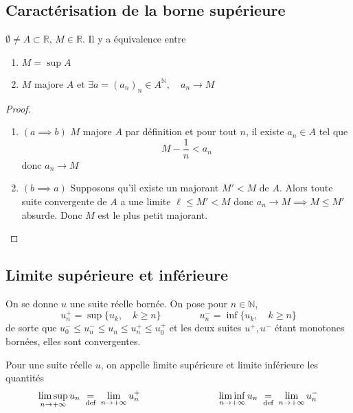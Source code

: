 \subsection{Caractérisation de la borne supérieure}

\begin{thm}
    \Hyp $\emptyset\neq A\subset\mathbb R$, $M\in\mathbb R$.
    \Conc Il y a équivalence entre \begin{enumerate}[label=(\alph{enumi}),left=1.2cm]
        \item $M=\sup A$
        \item $M$ majore $A$ et $\exists a=(a_n)_n\in A^{\mathbb N}, \quad a_n \longrightarrow M$
    \end{enumerate}
\end{thm}

\begin{proof}
    ~ \begin{enumerate}
        \item $(a\implies b)$ $M$ majore $A$ par définition et pour tout $n$, il existe $a_n\in A$ tel que \[
                M-\frac1n<a_n
            \]
            donc $a_n\longrightarrow M$
        \item $(b\implies a)$ Supposons qu'il existe un majorant $M'<M$ de $A$. Alors toute suite convergente de $A$ a une limite $\ell\leq M'<M$ donc $a_n\longrightarrow M\implies M\leq M'$ absurde. Donc $M$ est le plus petit majorant.
    \end{enumerate}
\end{proof}

\subsection{Limite supérieure et inférieure}

On se donne $u$ une suite réelle bornée. On pose pour $n\in\mathbb N$, \[
    u_n^+=\sup\{u_k, \quad k\geq n\}\qquad \qquad u_n^-=\inf \{u_k,\quad k\geq n\}
\]
de sorte que $u_0^-\leq u_n^-\leq u_n\leq u_n^+\leq u_0^+$ et les deux suites $u^+, u^-$ étant monotones bornées, elles sont convergentes.

\begin{dfn}
    Pour une suite réelle $u$, on appelle limite supérieure et limite inférieure les quantités \[
        \limsup_{n\to+\infty}u_n\;\underset{\text{def}}=\;\lim_{n\to+\infty}u_n^+\qquad\qquad\qquad\qquad \liminf_{n\to+\infty}u_n\;\underset{\text{def}}=\;\lim_{n\to+\infty}u_n^-
    \]
\end{dfn}

